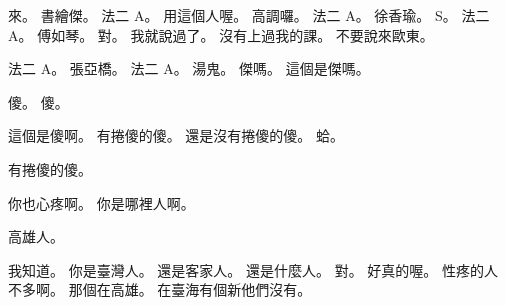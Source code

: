 \hypertarget{c01:cue:2253}{}來。
\hypertarget{c01:cue:2254}{}書繪傑。
\hypertarget{c01:cue:2255}{}法二 A。
\hypertarget{c01:cue:2256}{}用這個人喔。
\hypertarget{c01:cue:2257}{}高調囉。
\hypertarget{c01:cue:2258}{}法二 A。
\hypertarget{c01:cue:2259}{}徐香瑜。
\hypertarget{c01:cue:2260}{}S。
\hypertarget{c01:cue:2261}{}法二 A。
\hypertarget{c01:cue:2262}{}傅如琴。
\hypertarget{c01:cue:2263}{}對。
\hypertarget{c01:cue:2264}{}我就說過了。
\hypertarget{c01:cue:2265}{}沒有上過我的課。
\hypertarget{c01:cue:2266}{}不要說來歐東。

\hypertarget{c01:cue:2267}{}法二 A。
\hypertarget{c01:cue:2268}{}張亞橋。
\hypertarget{c01:cue:2269}{}法二 A。
\hypertarget{c01:cue:2270}{}湯鬼。
\hypertarget{c01:cue:2271}{}傑嗎。
\hypertarget{c01:cue:2272}{}這個是傑嗎。

\hypertarget{c01:cue:2273}{}傻。
\hypertarget{c01:cue:2274}{}傻。

\hypertarget{c01:cue:2275}{}這個是傻啊。
\hypertarget{c01:cue:2276}{}有捲傻的傻。
\hypertarget{c01:cue:2277}{}還是沒有捲傻的傻。
\hypertarget{c01:cue:2278}{}蛤。

\hypertarget{c01:cue:2279}{}有捲傻的傻。

\hypertarget{c01:cue:2280}{}你也心疼啊。
\hypertarget{c01:cue:2281}{}你是哪裡人啊。

\hypertarget{c01:cue:2282}{}高雄人。

\hypertarget{c01:cue:2283}{}我知道。
\hypertarget{c01:cue:2284}{}你是臺灣人。
\hypertarget{c01:cue:2285}{}還是客家人。
\hypertarget{c01:cue:2286}{}還是什麼人。
\hypertarget{c01:cue:2287}{}對。
\hypertarget{c01:cue:2288}{}好真的喔。
\hypertarget{c01:cue:2289}{}性疼的人不多啊。
\hypertarget{c01:cue:2290}{}那個在高雄。
\hypertarget{c01:cue:2291}{}在臺海有個新他們沒有。

